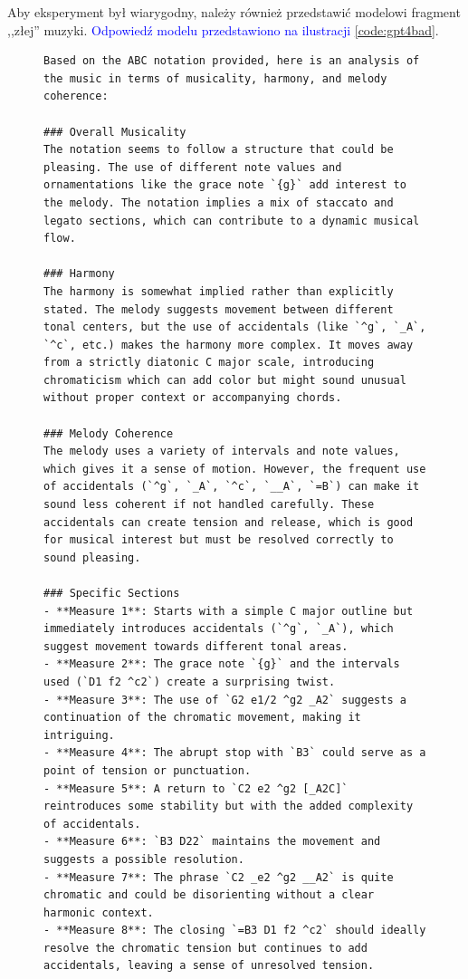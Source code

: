 \documentclass[data-science]{agh-wi} %
\begin{document}
Aby eksperyment był wiarygodny, należy również przedstawić modelowi fragment ,,złej'' muzyki. \textcolor{blue}{Odpowiedź modelu przedstawiono na ilustracji \ref*{code:gpt4bad}}.

\begin{figure}[ht!]
    \begin{verbatim}
Based on the ABC notation provided, here is an analysis of the music in terms of musicality, harmony, and melody coherence:

### Overall Musicality
The notation seems to follow a structure that could be pleasing. The use of different note values and ornamentations like the grace note `{g}` add interest to the melody. The notation implies a mix of staccato and legato sections, which can contribute to a dynamic musical flow.

### Harmony
The harmony is somewhat implied rather than explicitly stated. The melody suggests movement between different tonal centers, but the use of accidentals (like `^g`, `_A`, `^c`, etc.) makes the harmony more complex. It moves away from a strictly diatonic C major scale, introducing chromaticism which can add color but might sound unusual without proper context or accompanying chords.

### Melody Coherence
The melody uses a variety of intervals and note values, which gives it a sense of motion. However, the frequent use of accidentals (`^g`, `_A`, `^c`, `__A`, `=B`) can make it sound less coherent if not handled carefully. These accidentals can create tension and release, which is good for musical interest but must be resolved correctly to sound pleasing. 

### Specific Sections
- **Measure 1**: Starts with a simple C major outline but immediately introduces accidentals (`^g`, `_A`), which suggest movement towards different tonal areas.
- **Measure 2**: The grace note `{g}` and the intervals used (`D1 f2 ^c2`) create a surprising twist.
- **Measure 3**: The use of `G2 e1/2 ^g2 _A2` suggests a continuation of the chromatic movement, making it intriguing.
- **Measure 4**: The abrupt stop with `B3` could serve as a point of tension or punctuation.
- **Measure 5**: A return to `C2 e2 ^g2 [_A2C]` reintroduces some stability but with the added complexity of accidentals.
- **Measure 6**: `B3 D22` maintains the movement and suggests a possible resolution.
- **Measure 7**: The phrase `C2 _e2 ^g2 __A2` is quite chromatic and could be disorienting without a clear harmonic context.
- **Measure 8**: The closing `=B3 D1 f2 ^c2` should ideally resolve the chromatic tension but continues to add accidentals, leaving a sense of unresolved tension.


\end{verbatim}
\end{figure}
\end{document}
